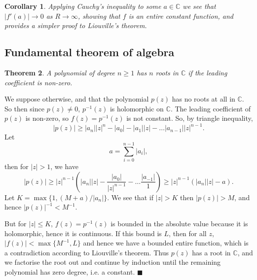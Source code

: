 \documentclass[letter-paper]{tufte-book}
\newtheorem{theorem}{\color{pastel-blue}Theorem}[section]
\newtheorem{corollary}[theorem]{\color{pastel-blue}Corollary}
\newenvironment{proof}[1][Proof]{\begin{trivlist}
\item[\hskip \labelsep {\bfseries #1}]}{\end{trivlist}}
\newcommand{\qed}{\hfill$\blacksquare$}
\begin{document}
\begin{corollary}
  Applying Cauchy's inequality to some $a\in\mathbb{C}$ we see that $|f'(a)| \to
  0$ as $R\to\infty$, showing that $f$ is an entire constant function, and
  provides a simpler proof to Liouville's theorem.
\end{corollary}


\subsection{Fundamental theorem of algebra}

\begin{theorem}
  A polynomial of degree $n\geq1$ has $n$ roots in $\mathbb{C}$ if the leading
  coefficient is non-zero.
\end{theorem}

\begin{proof}
  We suppose otherwise, and that the polynomial $p(z)$ has no roots at all in
  $\mathbb{C}$. So then since $p(z) \neq 0$, $p^{-1}(z)$ is holomorphic on
  $\mathbb{C}$. The leading coefficient of $p(z)$ is non-zero, so $f(z) =
  p^{-1}(z)$ is not constant. So, by triangle inequality,
  \begin{equation*}
    |p(z)| \geq |a_n| |z|^n - |a_0| - |a_1||z| - \ldots |a_{n-1}||z|^{n-1}.
  \end{equation*}
  Let
  \begin{equation*}
    a = \sum_{i=0}^{n-1} |a_i|,
  \end{equation*}
  then for $|z| > 1$, we have
  \begin{equation*}
    |p(z)| \geq |z|^{n-1} \left(|a_n||z| - \frac{|a_0|}{|z|^{n-1}} - \ldots \frac{|a_{-1}|}{1}\right) \geq |z|^{n-1}\left(|a_n||z| - a\right).
  \end{equation*}
  Let $K = \max\{1, (M+a)/|a_n|\}$. We see that if $|z| > K$ then $|p(z)| > M$,
  and hence $|p(z)|^{-1} < M^{-1}$. 
  
  But for $|z| \leq K$, $f(z) = p^{-1}(z)$ is bounded in the absolute value
  because it is holomorphic, hence it is continuous. If this bound is $L$, then
  for all $z$, $|f(z)| < \max\{M^{-1}, L\}$ and hence we have a bounded entire
  function, which is a contradiction according to Liouville's theorem. Thus
  $p(z)$ has a root in $\mathbb{C}$, and we factorise the root out and continue
  by induction until the remaining polynomial has zero degree, i.e. a constant. \qed
\end{proof}
\end{document}
